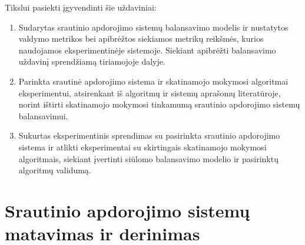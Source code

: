 \documentclass{VUMIFPSbakalaurinis}
\begin{document}
Tikslui pasiekti įgyvendinti šie uždaviniai:

\begin{enumerate}
    \item Sudarytas srautinio apdorojimo sistemų balansavimo modelis ir nustatytos valdymo metrikos bei apibrėžtos siekiamos metrikų reikšmės, kurios naudojamos eksperimentinėje sistemoje. Siekiant apibrėžti balansavimo uždavinį sprendžiamą tiriamojoje dalyje.
    \item Parinkta srautinė apdorojimo sistema ir skatinamojo mokymosi algoritmai eksperimentui, atsirenkant iš algoritmų ir sistemų aprašomų literatūroje, norint ištirti skatinamojo mokymosi tinkamumą srautinio apdorojimo sistemų balansavimui.
    \item Sukurtas eksperimentinis sprendimas su pasirinkta srautinio apdorojimo sistema ir atlikti eksperimentai su skirtingais skatinamojo mokymosi algoritmais, siekiant įvertinti siūlomo balansavimo modelio ir pasirinktų algoritmų validumą.
\end{enumerate}

\section{Srautinio apdorojimo sistemų matavimas ir derinimas}
\end{document}
